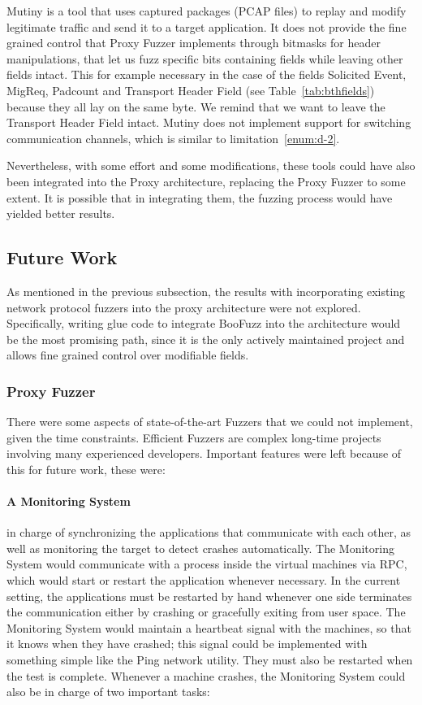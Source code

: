 Mutiny is a tool that uses captured packages (PCAP files) to replay and modify legitimate traffic and send it to a target application.
It does not provide the fine grained control that Proxy Fuzzer implements through bitmasks for header manipulations, that let us fuzz
specific bits containing fields while leaving other fields intact. This for example necessary in the case of the fields Solicited Event,
MigReq, Padcount and Transport Header Field (see Table~\ref{tab:bthfields}) because they all lay on the same byte. We remind that we want to
leave the Transport Header Field intact. Mutiny does
not implement support for switching communication channels, which is similar to limitation~\ref{enum:d-2}.

Nevertheless, with some effort and some modifications, these tools could have also been integrated
into the Proxy architecture, replacing the Proxy Fuzzer to some extent. It is possible that in integrating them, the fuzzing process would have yielded better results.


\subsection{Future Work}

As mentioned in the previous subsection, the results with incorporating
existing network protocol fuzzers into the proxy architecture were
not explored. Specifically, writing glue code to integrate BooFuzz into the architecture would
be the most promising path, since it is the only actively maintained project and allows fine grained control over modifiable fields.


\subsubsection{Proxy Fuzzer}

There were some aspects of state-of-the-art Fuzzers that we could not implement, given the time constraints.
Efficient Fuzzers are complex long-time projects involving many experienced developers. Important features were left
because of this for future work, these were:

\paragraph{A Monitoring System} in charge of synchronizing the applications that communicate with each other,
as well as monitoring the target to detect crashes automatically. The Monitoring System would communicate
with a process inside the virtual machines via RPC, which would start or restart the application whenever necessary.
In the current setting, the applications must be restarted by hand whenever one side terminates the communication either by crashing
or gracefully exiting from user space. The Monitoring System would maintain a heartbeat signal with the machines, so that it knows when they have
crashed; this signal could be implemented with something simple like the Ping network utility.
They must also be restarted when the test is complete. Whenever a machine crashes, the Monitoring
System could also be in charge of two important tasks:

